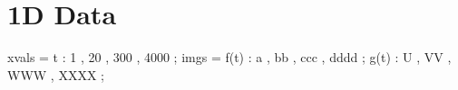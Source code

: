 \documentclass[12pt]{article}
\begin{document}


\section{1D Data}

\begin{functable}
    xvals =    t : 1 , 20 , 300 , 4000 ;
    imgs  = f(t) : a , bb , ccc , dddd ;
            g(t) : U , VV , WWW , XXXX ;
\end{functable}


\end{document}

